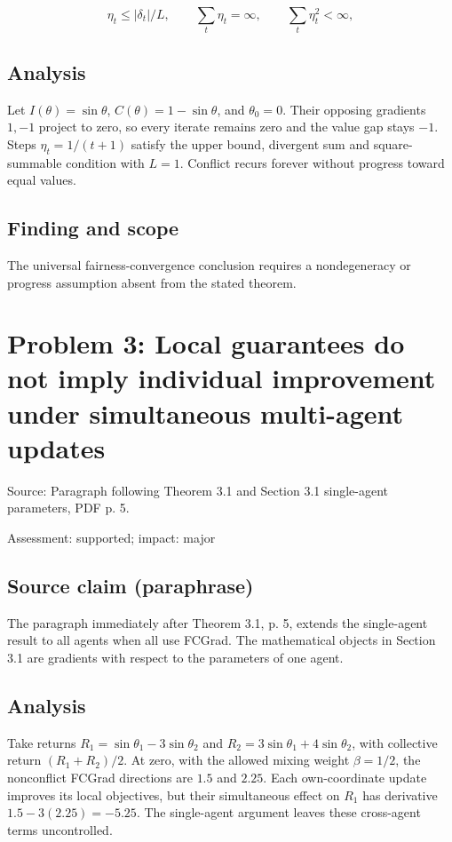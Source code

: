\documentclass[11pt]{article}
\begin{document}
\[\eta_t\leq|\delta_t|/L,\qquad \sum_t\eta_t=\infty,\qquad \sum_t\eta_t^2<\infty,\]

\subsection*{Analysis}

Let \(I(\theta)=\sin\theta\), \(C(\theta)=1-\sin\theta\), and \(\theta_0=0\). Their opposing gradients \(1,-1\) project to zero, so every iterate remains zero and the value gap stays \(-1\). Steps \(\eta_t=1/(t+1)\) satisfy the upper bound, divergent sum and square-summable condition with \(L=1\). Conflict recurs forever without progress toward equal values.

\subsection*{Finding and scope}

The universal fairness-convergence conclusion requires a nondegeneracy or progress assumption absent from the stated theorem.

\section*{Problem 3: Local guarantees do not imply individual improvement under simultaneous multi-agent updates}

Source: Paragraph following Theorem 3.1 and Section 3.1 single-agent parameters, PDF p. 5.

Assessment: supported; impact: major

\subsection*{Source claim (paraphrase)}

The paragraph immediately after Theorem 3.1, p. 5, extends the single-agent result to all agents when all use FCGrad. The mathematical objects in Section 3.1 are gradients with respect to the parameters of one agent.

\subsection*{Analysis}

Take returns \(R_1=\sin\theta_1-3\sin\theta_2\) and \(R_2=3\sin\theta_1+4\sin\theta_2\), with collective return \((R_1+R_2)/2\). At zero, with the allowed mixing weight \(\beta=1/2\), the nonconflict FCGrad directions are \(1.5\) and \(2.25\). Each own-coordinate update improves its local objectives, but their simultaneous effect on \(R_1\) has derivative \(1.5-3(2.25)=-5.25\). The single-agent argument leaves these cross-agent terms uncontrolled.
\end{document}
